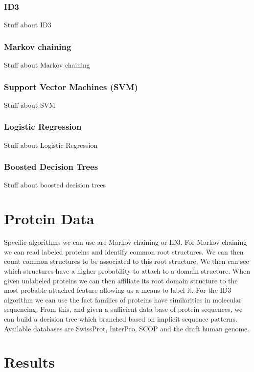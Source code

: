 \documentclass{article}
\begin{document}
\subsubsection*{ID3}

Stuff about ID3

\subsubsection*{Markov chaining}

Stuff about Markov chaining

\subsubsection*{Support Vector Machines (SVM)}

Stuff about SVM

\subsubsection*{Logistic Regression}

Stuff about Logistic Regression

\subsubsection*{Boosted Decision Trees}

Stuff about boosted decision trees

\section*{Protein Data}

Specific algorithms we can use are Markov chaining or ID3. For Markov chaining we can read labeled proteins and identify common root structures. We can then count common structures to be associated to this root structure. We then can see which structures have a higher probability to attach to a domain structure. When given unlabeled proteins we can then affiliate its root domain structure to the most probable attached feature allowing us a means to label it. For the ID3 algorithm we can use the fact families of proteins have similarities in molecular sequencing. From this, and given a sufficient data base of protein sequences, we can build a decision tree which branched based on implicit sequence patterns. Available databases are SwissProt, InterPro, SCOP and the draft human genome.

\section*{Results}
\end{document}
